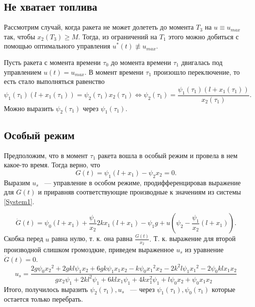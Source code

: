 \documentclass[10pt,pdf,hyperref={unicode}]{beamer}
\begin{document}
	\subsection{Не хватает топлива}
		Рассмотрим случай, когда ракета не может долететь до момента $T_3$ на $u \equiv u_{max}$ так, чтобы $x_2(T_3) \ge M.$
		Тогда, из ограничений на $T_1$ этого можно добиться с помощью оптимального управления $u^*(t) \not \equiv u_{max}.$

		Пусть ракета с момента времени $\tau_0$ до момента времени $\tau_1$ двигалась под управлением $u(t) = u_{max}.$
		В момент времени $\tau_1$ произошло переключение, то есть стало выполняться равенство
		\begin{equation}\label{psi2}
		\psi_1(\tau_1)(l + x_1(\tau_1)) = \psi_2(\tau_1) x_2(\tau_1) \Leftrightarrow 
		\psi_2(\tau_1) = \frac{\psi_1(\tau_1)\left(l + x_1(\tau_1)\right)}{x_2(\tau_1)}.
		\end{equation}
		Можно выразить $\psi_2(\tau_1)$ через $\psi_1(\tau_1).$
		\subsection{Особый режим}
		Предположим, что в момент $\tau_1$ ракета вошла в особый режим и провела в нем какое-то время.
		Тогда верно, что
		\[
		 G(t) = \psi_1(l + x_1)-\psi_2x_2 = 0.
		\]
		Выразим $u_s$ ~--- управление в особом режиме, продифференцировав выражение для $G(t)$ и приравняв соответствующие производные к значениям из системы \eqref{System1}.
		
		\[
		 \dot G(t) = \psi_0(l + x_1) + \frac{\psi_1}{x_2}2kx_1(l + x_1) - \psi_1 g + u\left(\psi_2 - \frac{\psi_1}{x_2}(l + x_1)\right).
		\]
		Скобка перед $u$ равна нулю, т. к. она равна $\frac{G(t)}{x_2}.$
		Т. к. выражение для второй производной слишком громоздкие, приведем выраженное $u_s$ из уравнение 
		$\ddot G(t) = 0.$
		\begin{equation}\label{specialU}
		 u_s = \frac{2g\psi_0 {x_2}^2 + 2gkl \psi_1 x_2 + 6gk\psi_1 x_1 x_2 - k\psi_0 {x_1}^2 x_2 - 2k^2l\psi_1{x_1}^2 - 2\psi_0kl x_1 x_2}
				{gx_2\psi_1 + 2kl^2\psi_1 + 6klx_1\psi_1 + 4kx_1^2\psi_1 + l\psi_0x_2 + \psi_0 x_1x_2}
		\end{equation}
		Итого, получилось выразить $\psi_2(\tau_1), u_s$ ~--- через $\psi_1(\tau_1), \psi_0(\tau_1)$ которые остается только перебрать.
		
\end{document}
